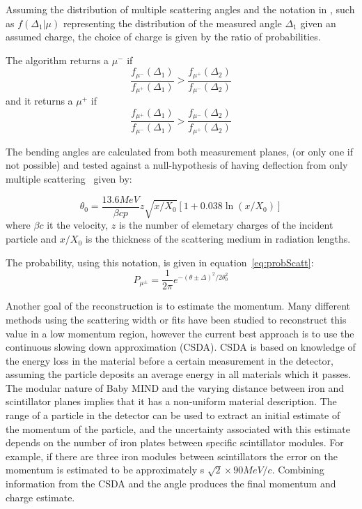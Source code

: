 Assuming the distribution of multiple scattering angles and the notation in , such as $f(\Delta_1 | \mu )$ representing the distribution of the measured angle $\Delta_1$ given an assumed charge, the choice of charge is given by the ratio of probabilities.

The algorithm returns a $\mu^-$ if 
\begin{equation}
\frac{f_{\mu^-}(\Delta_1)}{f_{\mu^+}(\Delta_1)} > \frac{f_{\mu^+}(\Delta_2)}{f_{\mu^-}(\Delta_2)}
\end{equation}
and it returns a $\mu^+$ if
\begin{equation}
\frac{f_{\mu^+}(\Delta_1)}{f_{\mu^-}(\Delta_1)} > \frac{f_{\mu^-}(\Delta_2)}{f_{\mu^+}(\Delta_2)}
\end{equation}



The bending angles are calculated from both measurement planes, (or only one if not possible) and tested against a null-hypothesis of having deflection from only multiple scattering~\cite{13PDG} given by:

\begin{equation}
\theta_0 = \frac{13.6 MeV}{\beta cp} z \sqrt{x/X_0}[1+0.038\ln(x/X_0)]
\end{equation}
where $\beta c$ it the velocity, $z$ is the number of elemetary charges of the incident particle and $x/X_0$ is the thickness of the scattering medium in radiation lengths.

The probability, using this notation, is given in equation~\ref{eq:probScatt}:
\begin{equation}
P_{\mu^\pm} = \frac{1}{2\pi} e^{-(\theta\pm\Delta)^2 / 2\theta_0^2}
\label{eq:probScatt}
\end{equation}

Another goal of the reconstruction is to estimate the momentum. Many different methods using the scattering width or fits have been studied to reconstruct this value in a low momentum region, however the current best approach is to use the continuous slowing down approximation (CSDA). CSDA is based on knowledge of the energy loss in the material before a certain measurement in the detector, assuming the particle deposits an average energy in all materials which it passes. The modular nature of Baby MIND and the varying distance between iron and scintillator planes implies that it has a non-uniform material description. The range of a particle in the detector can be used to extract an initial estimate of the momentum of the particle, and the uncertainty associated with this estimate depends on the number of iron plates between specific scintillator modules. For example, if there are three iron modules between scintillators the error on the momentum is estimated to be approximately s $\sqrt{2} \times 90 MeV/c$. Combining information from the CSDA and the angle produces the final momentum and charge estimate.

